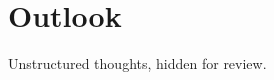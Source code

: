 \section{Outlook}\label{ausblick}

Unstructured thoughts, hidden for review. 





% 

% 


% 


% 



% 


% 


% 


